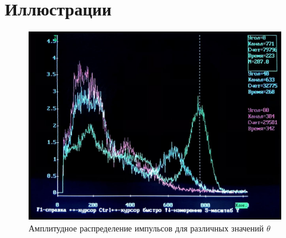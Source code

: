 \documentclass[reprint, nofootinbib, nobalancelastpage, 10pt]{revtex4-2}
\begin{document}
\section{Иллюстрации}

\begin{figure}[h!]
	\includegraphics[width=\linewidth]{pic4.jpg}
	\caption{Амплитудное распределение импульсов для различных значений $\theta$}
	\label{img:pic4}
\end{figure}
\end{document}
